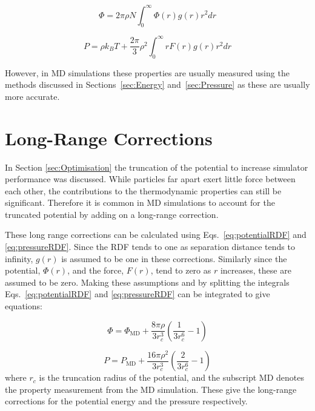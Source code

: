 \documentclass[12pt]{UoAthesis}
\begin{document}
\begin{equation}
\label{eq:potentialRDF}
\Phi = 2 \pi \rho N \int^\infty_0 \Phi(r)g(r)r^2 dr
\end{equation}

\begin{equation}
  \label{eq:pressureRDF}
  P = \rho k_BT + \frac{2\pi}{3}\rho^2 \int^\infty_0rF(r)g(r)r^2dr
\end{equation}

However, in MD simulations these properties are usually measured using
the methods discussed in Sections~\ref{sec:Energy}
and~\ref{sec:Pressure} as these are usually more accurate.  

\section{Long-Range Corrections}

In Section \ref{sec:Optimisation} the truncation of the potential to
increase simulator performance was discussed.  While particles far
apart exert little force between each other, the contributions to the
thermodynamic properties can still be significant.  Therefore it is
common in MD simulations to account for the truncated potential by
adding on a long-range correction.

These long range corrections can be calculated using
Eqs.~\eqref{eq:potentialRDF} and \eqref{eq:pressureRDF}.  Since the
RDF tends to one as separation distance tends to infinity, $g(r)$ is
assumed to be one in these corrections.  Similarly since the
potential, $\Phi(r)$, and the force, $F(r)$, tend to zero as $r$
increases, these are assumed to be zero.  Making these assumptions and
by splitting the integrals Eqs.~\eqref{eq:potentialRDF} and
\eqref{eq:pressureRDF} can be integrated to give equations:

\begin{equation}
  \label{eq:potentialLR}
  \Phi = \Phi_{\text{MD}}+ \frac{8 \pi \rho}{3r_c^3}\left(\frac{1}{3r_c^6} - 1\right)
\end{equation}

\begin{equation}
  \label{eq:pressureLR}
  P = P_{\text{MD}}+ \frac{16 \pi \rho^2}{3r_c^3}\left(\frac{2}{3r_c^6} - 1\right)
\end{equation}
where $r_c$ is the truncation radius of the potential, and the
subscript MD denotes the property measurement from the MD simulation.
These give the long-range corrections for the potential energy and the
pressure respectively.
\end{document}
